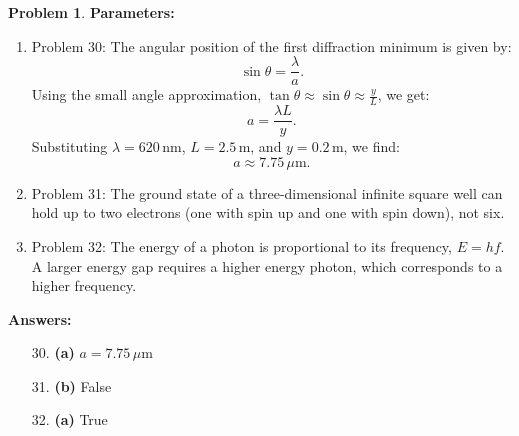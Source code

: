 \documentclass[12pt]{article}
\theoremstyle{definition} %
\newtheorem{problem}{Problem}
\theoremstyle{plain} %
\begin{document}
\begin{problem}
    \textbf{Parameters:}
    \begin{enumerate}
        \item Problem 30: The angular position of the first diffraction minimum is given by:
        $$
        \sin \theta = \frac{\lambda}{a}.
        $$
        Using the small angle approximation, \(\tan \theta \approx \sin \theta \approx \frac{y}{L}\), we get:
        $$
        a = \frac{\lambda L}{y}.
        $$
        Substituting \(\lambda = 620 \, \text{nm}\), \(L = 2.5 \, \text{m}\), and \(y = 0.2 \, \text{m}\), we find:
        $$
        a \approx 7.75 \, \mu\text{m}.
        $$
        \item Problem 31: The ground state of a three-dimensional infinite square well can hold up to two electrons (one with spin up and one with spin down), not six.
        \item Problem 32: The energy of a photon is proportional to its frequency, \(E = h f\). A larger energy gap requires a higher energy photon, which corresponds to a higher frequency.
    \end{enumerate}
    
    \textbf{Answers:}
    \begin{enumerate}
        \item[30.] \textbf{(a)} \(a = 7.75 \, \mu\text{m}\)
        \item[31.] \textbf{(b)} False
        \item[32.] \textbf{(a)} True
    \end{enumerate} 
\end{problem}
\end{document}
